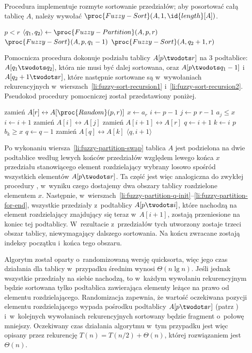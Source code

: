 Procedura  implementuje rozmyte sortowanie przedziałów; aby posortować całą tablicę $A$, należy wywołać $\proc{Fuzzy-Sort}(A,1,\id{length}[A])$.
\begin{codebox}
\li	\If $p<r$
\li		\Then
			$\langle q_1,q_2\rangle\gets\proc{Fuzzy-Partition}(A,p,r)$
\li			$\proc{Fuzzy-Sort}(A,p,q_1-1)$ \label{li:fuzzy-sort-recursion1}
\li			$\proc{Fuzzy-Sort}(A,q_2+1,r)$ \label{li:fuzzy-sort-recursion2}
		\End
\end{codebox}
Pomocnicza procedura  dokonuje podziału tablicy $A[p\twodots r]$ na 3 podtablice: $A[q_1\twodots q_2]$, która nie musi być dalej sortowana, oraz $A[p\twodots q_1-1]$ i~$A[q_2+1\twodots r]$, które następnie sortowane są w~wywołaniach rekurencyjnych w~wierszach~\ref{li:fuzzy-sort-recursion1} i~\ref{li:fuzzy-sort-recursion2}. Pseudokod procedury pomocniczej został przedstawiony poniżej.
\begin{codebox}
\li	zamień $A[r]\leftrightarrow A[\proc{Random}(p,r)]$
\li	$x\gets a_r$
\li $i\gets p-1$
\li	\For $j\gets p$ \To $r-1$
\li		\Do
			\If $a_j\le x$
\li				\Then
					$i\gets i+1$
\li					zamień $A[i]\leftrightarrow A[j]$
				\End
		\End
\li	zamień $A[i+1]\leftrightarrow A[r]$ \label{li:fuzzy-partition-swap}
\li	$q\gets i+1$ \label{li:fuzzy-partition-q-init}
\li	\For $k\gets i$ \Downto $p$
\li		\Do
			\If $b_k\ge x$
\li				\Then
					$q\gets q-1$
\li					zamień $A[q]\leftrightarrow A[k]$
				\End
		\End \label{li:fuzzy-partition-for-end}
\li	\Return $\langle q,i+1\rangle$
\end{codebox}
Po wykonaniu wiersza~\ref{li:fuzzy-partition-swap} tablica $A$ jest podzielona na dwie podtablice według lewych końców przedziałów względem lewego końca $x$ przedziału stanowiącego element rozdzielający wybrany losowo spośród wszystkich elementów $A[p\twodots r]$. Ta część jest więc analogiczna do zwykłej procedury , w~wyniku czego dostajemy dwa obszary tablicy rozdzielone elementem $x$. Następnie, w~wierszach~\ref{li:fuzzy-partition-q-init}\nobreakdash--\ref{li:fuzzy-partition-for-end}, wszystkie przedziały z~podtablicy $A[p\twodots i]$, które nachodzą na element rozdzielający znajdujący się teraz w~$A[i+1]$, zostają przeniesione na koniec tej podtablicy. W~rezultacie z~przedziałów tych utworzony zostaje trzeci obszar tablicy, niewymagający dalszego sortowania. Na końcu zwracane zostają indeksy początku i~końca tego obszaru.

\subproblem %
Algorytm został oparty o~randomizowaną wersję quicksorta, więc jego czas działania dla tablicy  w~przypadku średnim wynosi $\Theta(n\lg n)$. Jeśli jednak wszystkie przedziały na siebie nachodzą, to w~każdym wywołaniu rekurencyjnym będzie sortowana tylko podtablica zawierająca elementy leżące na prawo od elementu rozdzielającego. Randomizacja zapewnia, że wartość oczekiwana pozycji elementu rozdzielającego wypada pośrodku podtablicy $A[p\twodots r]$ (patrz ) i~w~kolejnych wywołaniach rekurencyjnych sortowany będzie fragment o~połowę mniejszy. Oczekiwany czas działania algorytmu w~tym przypadku jest więc opisany przez rekurencję $T(n)=T(n/2)+\Theta(n)$, której rozwiązaniem jest $\Theta(n)$.

\endinput
